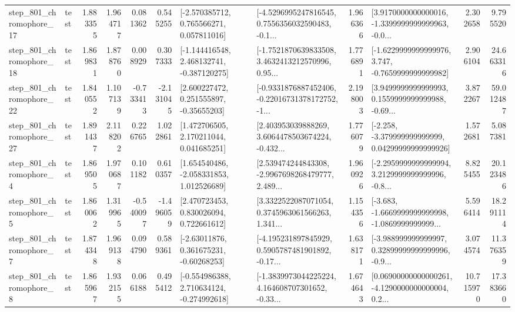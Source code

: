 \begin{tabular}{llrrrrllrlrr}
  step\_801\_chromophore\_17 &      test &      1.883355 &    1.964717 &      0.081362 &  0.545255 &    [-2.570385712, 0.765566271, 0.057811016] &  [-4.5296995247816545, 0.7556356032590483, -0.1... &       1.966366 &  [3.9170000000000016, -1.3399999999999963, -0.0... &            2.302658 &          9.795520 \\
  step\_801\_chromophore\_18 &      test &      1.869831 &    1.878760 &      0.008929 &  0.307333 &   [-1.144416548, 2.468132741, -0.387120275] &  [-1.7521870639833508, 3.4632413212570996, 0.95... &       1.776891 &  [-1.6229999999999976, 3.747, -0.7659999999999982] &            2.906104 &         24.663316 \\
  step\_801\_chromophore\_22 &      test &      1.840552 &    1.107139 &     -0.733413 & -2.131045 &     [2.600227472, 0.251555897, -0.35655203] &  [-0.9331876887452406, -0.22016731378172752, -1... &       2.198003 &  [3.9499999999999993, 0.1559999999999988, -0.69... &            3.872267 &         59.012487 \\
  step\_801\_chromophore\_27 &      test &      1.891437 &    2.118202 &      0.226765 &  1.022861 &     [1.472706505, 2.170211044, 0.041685251] &  [2.403953039888269, 3.6064478503674224, -0.432... &       1.776079 &  [-2.258, -3.379999999999999, 0.04299999999999926] &            1.572681 &          5.087381 \\
   step\_801\_chromophore\_4 &      test &      1.869505 &    1.970687 &      0.101182 &  0.610357 &    [1.654540486, -2.058331853, 1.012526689] &  [2.539474244843308, -2.9967698268479777, 2.489... &       1.960926 &  [-2.2959999999999994, 3.2129999999999996, -0.8... &            8.825455 &         20.123486 \\
   step\_801\_chromophore\_5 &      test &      1.860062 &    1.319965 &     -0.540097 & -1.496059 &     [2.470723453, 0.830026094, 0.722661612] &  [3.3322522087071054, 0.3745963061566263, 1.341... &       1.154356 &  [-3.683, -1.6669999999999998, -1.0869999999999... &            5.596414 &         18.291114 \\
   step\_801\_chromophore\_7 &      test &      1.874348 &    1.969138 &      0.094790 &  0.589361 &     [-2.63011876, 0.361675231, -0.60268253] &  [-4.195231897845929, 0.5905787481901892, -0.17... &       1.638171 &  [-3.988999999999997, 0.32899999999999996, -0.9... &            3.074574 &         11.376359 \\
   step\_801\_chromophore\_8 &      test &      1.865967 &    1.932155 &      0.066188 &  0.495412 &   [-0.554986388, 2.710634124, -0.274992618] &  [-1.3839973044225224, 4.164608707301652, -0.33... &       1.674643 &  [0.06900000000000261, -4.1290000000000004, 0.2... &           10.715970 &         17.383660 \\

\end{tabular}
